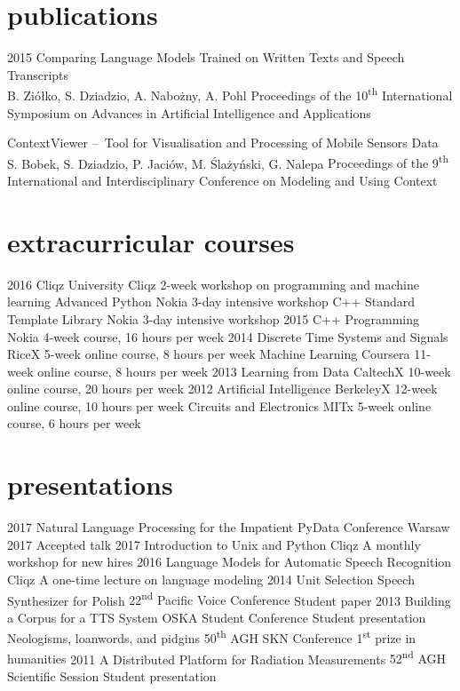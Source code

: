 \documentclass[]{friggeri-cv_osx}
\begin{document}
\section{publications}
\begin{entrylist}
\entry
{2015}
{Comparing Language Models Trained on Written Texts and Speech Transcripts\\}
{B. Ziółko, S. Dziadzio, A. Nabożny, A. Pohl}
{Proceedings of the 10\textsuperscript{th} International Symposium on Advances in Artificial Intelligence and Applications\\}

\entry
{}
{ContextViewer – Tool for Visualisation and Processing of Mobile Sensors Data\\}
{S. Bobek, S. Dziadzio, P. Jaciów, M. Ślażyński, G. Nalepa}
{Proceedings of the 9\textsuperscript{th} International and Interdisciplinary Conference on Modeling and Using Context\\}
\end{entrylist}


\section{extracurricular courses}
\begin{entrylist}
\entry
{2016}
{Cliqz University}
{Cliqz}
{2-week workshop on programming and machine learning}
\entry
{}
{Advanced Python}
{Nokia}
{3-day intensive workshop}
\entry
{}
{C++ Standard Template Library}
{Nokia}
{3-day intensive workshop}
\entry
{2015}
{C++ Programming}
{Nokia}
{4-week course, 16 hours per week}
\entry
{2014}
{Discrete Time Systems and Signals}
{RiceX}
{5-week online course, 8 hours per week}
\entry
{}
{Machine Learning}
{Coursera}
{11-week online course, 8 hours per week}
\entry
{2013}
{Learning from Data}
{CaltechX}
{10-week online course, 20 hours per week}
\entry
{2012}
{Artificial Intelligence}
{BerkeleyX}
{12-week online course, 10 hours per week}
\entry
{}
{Circuits and Electronics}
{MITx}
{5-week online course, 6 hours per week\\}
\end{entrylist}


\section{presentations}
\begin{entrylist}
\entry
{2017}
{Natural Language Processing for the Impatient}
{PyData Conference Warsaw 2017}
{Accepted talk}
\entry
{2017}
{Introduction to Unix and Python}
{Cliqz}
{A monthly workshop for new hires}
\entry
{2016}
{Language Models for Automatic Speech Recognition}
{Cliqz}
{A one-time lecture on language modeling}
\entry
{2014}
{Unit Selection Speech Synthesizer for Polish}
{22\textsuperscript{nd} Pacific Voice Conference}
{Student paper}
\entry
{2013}
{Building a Corpus for a TTS System}
{OSKA Student Conference}
{Student presentation}
\entry
{}
{Neologisms, loanwords, and pidgins}
{50\textsuperscript{th} AGH SKN Conference}
{1\textsuperscript{st} prize in humanities}
\entry
{2011}
{A Distributed Platform for Radiation Measurements}
{52\textsuperscript{nd} AGH Scientific Session}
{Student presentation}
\end{entrylist}
\end{document}
